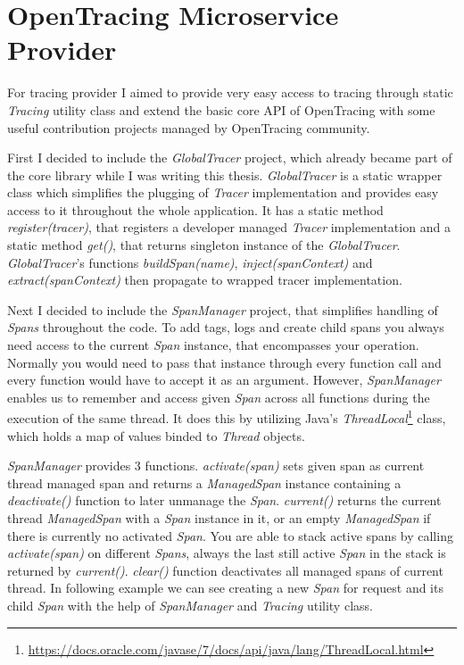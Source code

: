 \documentclass[12pt,oneside]{fithesis2}
\begin{document}
\section{OpenTracing Microservice Provider}

For tracing provider I aimed to provide very easy access to tracing through static \textit{Tracing} utility class and extend the basic core API of OpenTracing with some useful contribution projects managed by OpenTracing community.

First I decided to include the \textit{GlobalTracer} project, which already became part of the core library while I was writing this thesis. \textit{GlobalTracer} is a static wrapper class which simplifies the plugging of \textit{Tracer} implementation and provides easy access to it throughout the whole application. It has a static method \textit{register(tracer)}, that registers a developer managed \textit{Tracer} implementation and a static method \textit{get()}, that returns singleton instance of the \textit{GlobalTracer}. \textit{GlobalTracer}'s functions \textit{buildSpan(name)}, \textit{inject(spanContext)} and \textit{extract(spanContext)} then propagate to wrapped tracer implementation.

Next I decided to include the \textit{SpanManager} project, that simplifies handling of \textit{Spans} throughout the code. To add tags, logs and create child spans you always need access to the current \textit{Span} instance, that encompasses your operation. Normally you would need to pass that instance through every function call and every function would have to accept it as an argument. However, \textit{SpanManager} enables us to remember and access given \textit{Span} across all functions during the execution of the same thread.
It does this by utilizing Java's \textit{ThreadLocal}\footnote{\url{https://docs.oracle.com/javase/7/docs/api/java/lang/ThreadLocal.html}} class, which holds a map of values binded to \textit{Thread} objects.

\textit{SpanManager} provides 3 functions. \textit{activate(span)} sets given span as current thread managed span and returns a \textit{ManagedSpan} instance containing a \textit{deactivate()} function to later unmanage the \textit{Span}. \textit{current()} returns the current thread \textit{ManagedSpan} with a \textit{Span} instance in it, or an empty \textit{ManagedSpan} if there is currently no activated \textit{Span}. You are able to stack active spans by calling \textit{activate(span)} on different \textit{Spans}, always the last still active \textit{Span} in the stack is returned by \textit{current()}. \textit{clear()} function deactivates all managed spans of current thread. In following example we can see creating a new \textit{Span} for request and its child \textit{Span} with the help of \textit{SpanManager} and \textit{Tracing} utility class.
\newline
\end{document}
